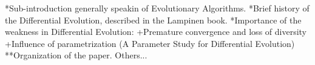 *Sub-introduction generally speakin of Evolutionary Algorithms.
*Brief history of the Differential Evolution, described in the Lampinen book.
*Importance of the weakness in Differential Evolution:
  +Premature convergence and loss of diversity
  +Influence of parametrization (A Parameter Study for Differential Evolution)
**Organization of the paper.
Others...
